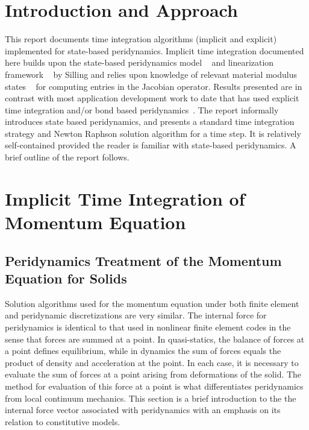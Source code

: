 \documentclass[pdf,ps2pdf,12pt]{SANDreport}
\begin{document}
\section{Introduction and Approach}\label{section:introduction}
    This report documents time integration algorithms (implicit and explicit) implemented for state-based peridynamics.  Implicit time integration documented here builds upon the state-based peridynamics model ~\cite{ref:pdStates.Silling} and linearization framework ~\cite{ref:pdLinearization.Silling} by Silling and relies upon knowledge of relevant material modulus states ~\cite{ref:statePlasticityMitchell} for computing entries in the Jacobian operator.    Results presented are in contrast with most application development work to date that has used explicit time integration and/or bond based peridynamics~\cite{ref:pdOriginal.Silling}.  The report informally introduces state based peridynamics, and presents a standard time integration strategy and Newton Raphson solution algorithm for a time step.   It is relatively self-contained provided the reader is familiar with state-based peridynamics.   A brief outline of the report follows.   



\section{Implicit Time Integration of Momentum Equation}
\subsection{Peridynamics Treatment of the Momentum Equation for Solids}
Solution algorithms used for the momentum equation under both finite element and peridynamic discretizations are very similar.   The internal force for peridynamics is identical to that used in nonlinear finite element codes in the sense that forces are summed at a point.  In quasi-statics, the balance of forces at a point  defines equilibrium, while in dynamics the sum of forces equals the product of density and acceleration at the point.  In each case, it is necessary to evaluate the sum of forces at a point arising from deformations of the solid.  The method for evaluation of this force at a point is what differentiates peridynamics~\cite{ref:pdOriginal.Silling, ref:pdStates.Silling} from local continuum mechanics. This section is a brief introduction to the the internal force vector associated with peridynamics with an emphasis on its relation to constitutive models.  
\end{document}
